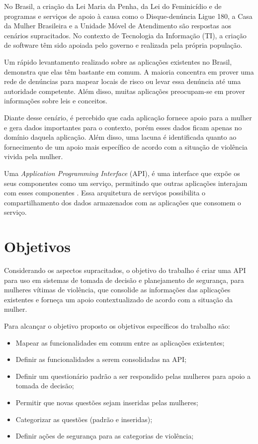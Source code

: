 No Brasil, a criação da Lei Maria da Penha, da Lei do Feminicídio e de programas e serviços de apoio à causa 
como o Disque-denúncia Ligue 180, a Casa da Mulher Brasileira e a Unidade Móvel de Atendimento são respostas aos cenários supracitados. No contexto de Tecnologia da Informação (TI), a criação de software têm sido apoiada pelo governo e realizada pela própria população.

Um rápido levantamento realizado sobre as aplicações existentes no Brasil, demonstra que elas têm bastante em comum. A maioria concentra em prover uma rede de denúncias para mapear locais de risco ou levar essa
denúncia até uma autoridade competente. Além disso, muitas aplicações preocupam-se em prover informações sobre leis e conceitos.

Diante desse cenário, é percebido que cada aplicação fornece apoio para a mulher e 
gera dados importantes para o contexto, porém esses dados ficam apenas no domínio daquela aplicação. 
Além disso, uma lacuna é identificada quanto ao fornecimento de um apoio mais específico de acordo com a situação de violência vivida pela mulher.

Uma \textit{Application Programming Interface} (API), é uma interface que expõe os seus componentes como um serviço, permitindo que outras aplicações interajam com esses componentes \cite{wagh2012comparative, understanding_web}. Essa arquitetura de serviços possibilita o compartilhamento dos dados armazenados com as aplicações que consomem o serviço. 

\section{Objetivos}

Considerando os aspectos supracitados, o objetivo do trabalho é criar uma API para uso em sistemas de tomada de decisão e planejamento de segurança, para mulheres vítimas de violência, que consolide as informações das aplicações existentes e forneça um apoio contextualizado de acordo com a situação da mulher.

Para alcançar o objetivo proposto os objetivos específicos do trabalho são:
\begin{itemize}
	\item Mapear as funcionalidades em comum entre as aplicações existentes;
	\item Definir as funcionalidades a serem consolidadas na API;
	\item Definir um questionário padrão a ser respondido pelas mulheres para apoio a tomada de decisão;
	\item Permitir que novas questões sejam inseridas pelas mulheres;
	\item Categorizar as questões (padrão e inseridas);
	\item Definir ações de segurança para as categorias de violência;
\end{itemize}

